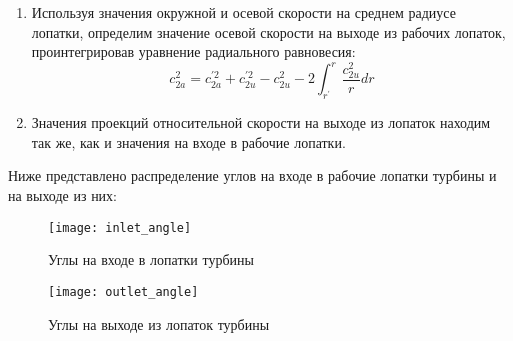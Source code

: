\begin{enumerate}
	\item Используя значения окружной и осевой скорости на среднем радиусе лопатки, определим значение осевой скорости на выходе из рабочих лопаток, проинтегрировав уравнение радиального равновесия:
		$$
			c_{2a}^2 = c_{2a}^{\prime 2} + c_{2u}^{\prime 2} - c_{2u}^{2} - 2 \int_{r^\prime}^r \frac{c_{2u}^2}{r} dr
		$$
%

	\item Значения проекций относительной скорости на выходе из лопаток находим так же, как и значения на входе в рабочие лопатки.


\end{enumerate}

Ниже представлено распределение углов на входе в рабочие лопатки турбины и на выходе из них:
	\begin{figure}
		\centering
		\texttt{[image: inlet\_angle]}
		\caption{Углы на входе в лопатки турбины}
	\end{figure}

	\begin{figure}
		\centering
		\texttt{[image: outlet\_angle]}
		\caption{Углы на выходе из лопаток турбины}
	\end{figure}

